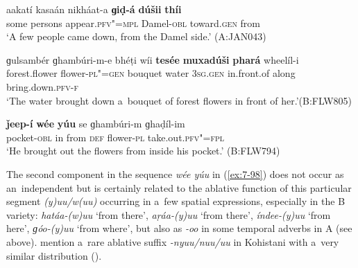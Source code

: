 

\begin{exe}
\ex
\label{ex:7-96}
\gll aakatí kasaán nikháat-a \textbf{ɡiḍ-á} \textbf{dúšii} \textbf{\textmd{thíi}} \\
some persons appear.\textsc{pfv"=mpl} Damel-\textsc{obl} toward.\textsc{gen} from \\
\glt `A few people came down, from the Damel side.' (A:JAN043)
\end{exe}

\ea
\label{ex:7-97}
\gll ɡulsambér ɡhambúri-m-e bhéṭi wíi \textbf{tesée} \textbf{muxadúši} \textbf{phará} wheelíl-i\\
forest.flower flower-\textsc{pl"=gen} bouquet water \textsc{3sg.gen} in.front.of along bring.down.\textsc{pfv-f}\\
\glt `The water brought down a~bouquet of forest flowers in front of her.'\newline (B:FLW805)
\z

\begin{exe}
\ex
\label{ex:7-98}
\gll \label{bkm:Ref193771773}\textbf{ǰeep-í} \textbf{wée} \textbf{yúu} se ɡhambúri-m ɡhaḍíl-im \\
pocket-\textsc{obl} in from \textsc{def} flower-\textsc{pl}  take.out.\textsc{pfv"=fpl}\\
\glt `He brought out the flowers from inside his pocket.' (B:FLW794)
\end{exe}


The second component in the sequence \textit{wée yúu} in (\ref{ex:7-98}) does not occur as an~independent  but is certainly related to the ablative function of this particular segment \textit{(y)uu/w(uu)} occurring in a~few spatial expressions, especially in the B variety: \textit{hatáa-(w)uu} `from there', \textit{aṛáa-(y)uu} `from there', \textit{índee-(y)uu} `from here', \textit{ɡóo-(y)uu} `from where', but also as \textit{-oo} in some temporal adverbs in A (see  above). \citeauthor{schmidtkohistani2001} mention a~rare ablative suffix \textit{-nyuu/nuu/uu} in Kohistani \iliShina with a~very similar distribution (\citeyear[130]{schmidtkohistani2001}).



